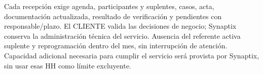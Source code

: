 Cada recepción exige agenda, participantes y suplentes, casos, acta, documentación actualizada, resultado de verificación y pendientes con responsable/plazo. El CLIENTE valida las decisiones de negocio; Synaptix conserva la administración técnica del servicio. Ausencia del referente activa suplente y reprogramación dentro del mes, sin interrupción de atención. Capacidad adicional necesaria para cumplir el servicio será provista por Synaptix, sin usar esas HH como límite excluyente.~\parencite[RT-22.07--08; p.~38]{bases-transversales}~\parencite[arts.~89--90; p.~45]{bases-admin}
